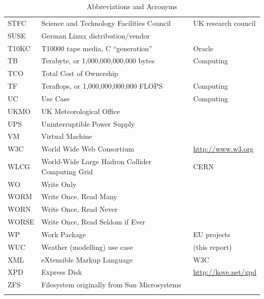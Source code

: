 \documentclass{../../template/esiwace-report}
\begin{document}
\begin{longtable}{|l|l|l|}
  STFC        &       Science and Technology Facilities Council       &       UK research council             \\
  SUSE        &         German Linux distribution/vendor              &                                       \\
  T10KC       &       T10000 tape media, C ``generation''             &       Oracle                          \\
  TB          &         Terabyte, or 1,000,000,000,000 bytes          &         Computing                     \\
  TCO         &         Total Cost of Ownership                       &                                       \\
  TF          &         Teraflops, or 1,000,000,000,000 FLOPS         &         Computing                     \\
  UC         &          Use Case                                     &          Computing                    \\
  UKMO        &         UK Meteorological Office                      &                                       \\
  UPS         &       Uninterruptible Power Supply                    &                                       \\
  VM          &       Virtual Machine                                 &                                       \\
  W3C	      &		World Wide Web Consortium		      &		\url{http://www.w3.org}			\\
  WLCG        &       World-Wide Large Hadron Collider Computing Grid &      CERN                             \\
  WO          &	Write Only                                      &                                       \\
  WORM        &       Write Once, Read Many                           &                                       \\
  WORN        &       Write Once, Read Never                          &                                       \\
  WORSE       &       Write Once, Read Seldom if Ever                 &                                       \\
  WP          &       Work Package                                    &       EU projects                     \\
  WUC         &         Weather (modelling) use case                  &         (this report)                 \\
  XML         &       eXtensible Markup Language                      &         W3C                           \\
  XPD         &      Express Disk                                                 &         \url{http://kove.net/xpd}           \\
  ZFS         &       Filesystem originally from Sun Microsystems     &						\\
  \hline
  \caption{Abbreviations and Acronyms}
  \label{tab:abbr}
\end{longtable}
\end{document}
